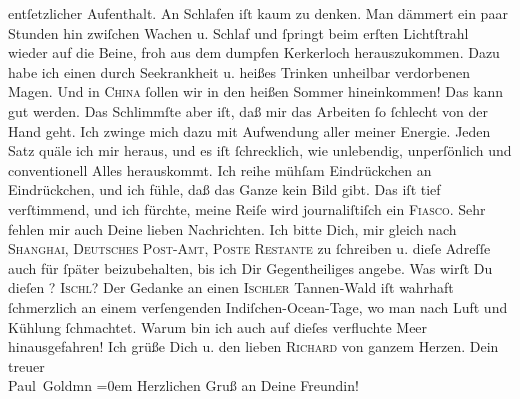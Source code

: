 \begin{ledgroupsized}[t]{13cm}
               entſetzlicher Aufenthalt. An Schlafen iſt kaum zu denken. Man dämmert ein paar
               Stunden hin zwiſchen Wachen u. Schlaf und ſpr\textcolor{gray}{i}ngt beim erſten
               Lichtſtrahl wieder auf die Beine, froh aus {\pb}dem
               dumpfen Kerkerloch herauszukommen. Dazu habe ich einen \strikeout{\textcolor{gray}{du}} durch Seekrankheit u. heißes Trinken unheilbar verdorbenen Magen. Und in \textsc{China} ſollen wir in den heißen Sommer hineinkommen! Das kann gut werden. Das
               Schlimmſte aber iſt, daß mir das Arbeiten ſo ſchlecht von der Hand geht. Ich zwinge
               mich dazu mit Aufwendung aller meiner Energie. {\pb}Jeden Satz quäle ich mir heraus, und es iſt ſchrecklich, wie unlebendig,
               unperſönlich und conventionell Alles herauskommt. Ich reihe mühſam Eindrückchen an
               Eindrückchen, und ich fühle, daß das Ganze kein Bild gibt. Das iſt tief verſtimmend,
               und ich fürchte, meine Reiſe wird journaliſtiſch ein \textsc{Fiasco}.\pend
           \pstart
           Sehr fehlen mir auch Deine lieben Nachrichten. Ich bitte Dich, mir gleich {\pb}nach \textsc{Shanghai}, \textsc{Deutsches Post-Amt, Poste Restante} zu
               ſchreiben u. dieſe Adreſſe auch für ſpäter beizubehalten, bis ich Dir Gegentheiliges
               angebe.\pend
           \pstart
           Was wirſt Du dieſen \label{K_L02846-1v}\label{K_L02846-1h}? \textsc{Ischl}? Der Gedanke an einen \textsc{Ischler} Tannen-Wald  iſt {\pb}wahrhaft ſchmerzlich an einem verſengenden
                  Indiſchen-Ocean-Tage, wo man nach Luft und
               Kühlung ſchmachtet. Warum bin ich auch auf dieſes verfluchte Meer hinausgefahren!\pend
           \pstart
           Ich grüße Dich u. den lieben \textsc{Richard} von ganzem Herzen.\pend
           \pstart
           Dein treuer {\\[\baselineskip]}\spacefill\mbox{Paul Goldmn}\pend
           \leftskip=0em{}\pstart
           \noindent{}Herzlichen Gruß an Deine Freundin!\pend
           
         
         \endnumbering{}\end{ledgroupsized}  \newcommand{\dateiname}{L02846}\newcommand{\titel}{Paul Goldmann an Arthur Schnitzler, 21. 4. [1898]}\newcommand{\editorInnen}{Martin Anton Müller und Laura Untner}
      